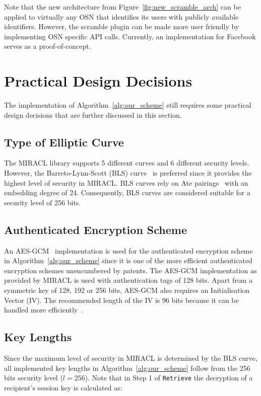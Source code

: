 Note that the new architecture from Figure~\ref{fig:new_scramble_arch} can be applied to virtually any OSN that identifies its users with publicly available identifiers. However, the scramble plugin can be made more user friendly by implementing OSN specific API calls. Currently, an implementation for Facebook serves as a proof-of-concept.


\section{Practical Design Decisions}
The implementation of Algorithm~\ref{alg:our_scheme} still requires some practical design decisions that are further discussed in this section.

\subsection{Type of Elliptic Curve}
The MIRACL library supports 5 different curves and 6 different security levels. However, the Barreto-Lynn-Scott (BLS) curve~\cite{art:BarretoLS02} is preferred since it provides the highest level of security in MIRACL. BLS curves rely on Ate pairings~\cite{art:HessSV06} with an embedding degree of 24. Consequently, BLS curves are considered suitable for a security level of 256 bits.

\subsection{Authenticated Encryption Scheme}
An AES-GCM~\cite{art:McGrewV04} implementation is used for the authenticated encryption scheme in Algorithm~\ref{alg:our_scheme} since it is one of the more efficient authenticated encryption schemes unencumbered by patents. The AES-GCM implementation as provided by MIRACL is used with authentication tags of 128 bits. Apart from a symmetric key of 128, 192 or 256 bits, AES-GCM also requires an Initialisation Vector (IV). The recommended length of the IV is 96 bits because it can be handled more efficiently~\cite{rfc5084}.

\subsection{Key Lengths}
Since the maximum level of security in MIRACL is determined by the BLS curve, all implemented key lengths in Algorithm~\ref{alg:our_scheme} follow from the 256 bits security level ($l=256$). Note that in Step 1 of \texttt{Retrieve} the decryption of a recipient's session key is calculated as: 

